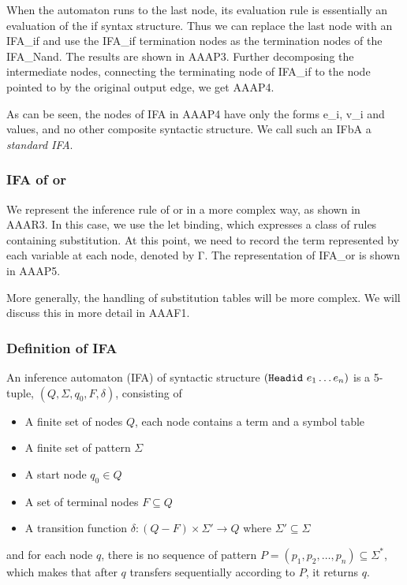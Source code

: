 When the automaton runs to the last node, its evaluation rule is essentially an evaluation of the if syntax structure. Thus we can replace the last node with an IFA\_if and use the IFA\_if termination nodes as the termination nodes of the IFA\_Nand. The results are shown in AAAP3. Further decomposing the intermediate nodes, connecting the terminating node of IFA\_if to the node pointed to by the original output edge, we get AAAP4.

As can be seen, the nodes of IFA in AAAP4 have only the forms e\_i, v\_i and values, and no other composite syntactic structure.  We call such an IFbA a \textit{standard IFA}.

\subsubsection{IFA of or}

We represent the inference rule of or in a more complex way, as shown in AAAR3. In this case, we use the let binding, which expresses a class of rules containing substitution. At this point, we need to record the term represented by each variable at each node, denoted by Γ. The representation of IFA\_or is shown in AAAP5.

More generally, the handling of substitution tables will be more complex. We will discuss this in more detail in AAAF1.

\subsubsection{Definition of IFA}

\begin{Def}

An inference automaton (IFA) of syntactic structure $(\mbox{\tt Headid}~e_1 \ldots e_n)$ is a 5-tuple, $(Q, \Sigma, q_0, F, \delta)$, consisting of

\begin{itemize}
    \item A finite set of nodes $Q$, each node contains a term and a symbol table
    \item A finite set of pattern $\Sigma$
    \item A start node $q_0 \in Q$
    \item A set of terminal nodes $F \subseteq Q$
    \item A transition function $\delta: (Q-F) \times \Sigma' \to Q$ where $\Sigma' \subseteq \Sigma$
\end{itemize}

and for each node $q$, there is no sequence of pattern $P = (p_1,p_2,\ldots,p_n)\subseteq \Sigma^*$, which makes that after $q$ transfers sequentially according to $P$, it returns $q$.

\end{Def}

